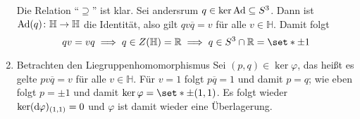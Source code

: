 \begin{beweis}
\begin{enumerate}[(1)]
		Die Relation \enquote{$\supseteq$} ist klar.
		Sei andersrum $q \in \ker {\operatorname{Ad}} \subseteq S^3$.
		Dann ist $\operatorname{Ad}(q) \colon \mathbb{H} \to \mathbb{H}$ die Identität, also gilt $qv \overline{q} = v$ für alle $v \in \mathbb{H}$.
		Damit folgt
		\[
			q v = v q \implies q \in Z(\mathbb{H}) = \mathbb{R} \implies q \in S^3 \cap \mathbb{R} = \set*{\pm 1}
		\]
		\item Betrachten den Liegruppenhomomorphismus
		Sei $(p,q) \in \ker \varphi$, das heißt es gelte $p v \overline{q}=v$ für alle $v \in \mathbb{H}$.
		Für $v =1$ folgt $p \overline{q}=1$ und damit $p=q$; wie eben folgt $p =\pm 1$ und damit $\ker \varphi = \set*{\pm (1,1)}$.
		Es folgt wieder $\ker (\mathrm{d}\mkern-1.0mu \varphi)_{(1,1)}=0$ und $\varphi$ ist damit wieder eine Überlagerung.\qedhere
	\end{enumerate}
\end{beweis}

